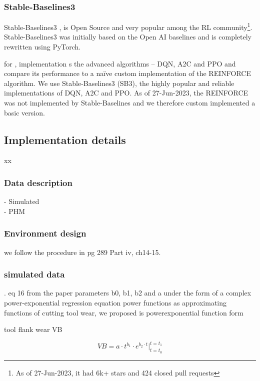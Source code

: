\documentclass[a4paper, 12pt]{article}
\begin{document}
\subsubsection{Stable-Baselines3}
Stable-Baselines3 \cite{SB3-paper}, is Open Source and very popular among the RL community\footnote{As of 27-Jun-2023, it had 6k+ stars and 424 closed pull requests}. Stable-Baselines3 was initially based on the Open AI baselines \citep{OpenAI-baselines} and is completely rewritten using PyTorch. 

 for  , implementation s  the advanced algorithms -- DQN, A2C and PPO and compare its performance to a na\"ive custom implementation of the REINFORCE algorithm. We use Stable-Baselines3 (SB3), the highly popular and reliable implementations of DQN, A2C and PPO. As of 27-Jun-2023, the REINFORCE was not implemented by Stable-Baselines and we therefore custom implemented a basic version. 





\subsection{Implementation details}
xx\\

\subsubsection{Data description}
- Simulated\\
- PHM\\
\subsubsection{Environment design}
we follow the procedure in \cite{graesser2019} pg 289 Part iv, ch14-15.
\subsubsection{simulated data}
\citep{davsic2006}. eq 16 from the paper 
parameters b0, b1, b2 and a under the form of a
complex power-exponential regression equation
power functions as approximating
functions of cutting tool wear, we proposed is powerexponential
function form

tool
flank wear VB

\begin{equation}
	VB = a \cdot t^{b_1} \cdot e^{b_2 \cdot t} \Big|_{t=t_0}^{t=t_1}
	\label{eq:Dasic}
\end{equation}
\end{document}
